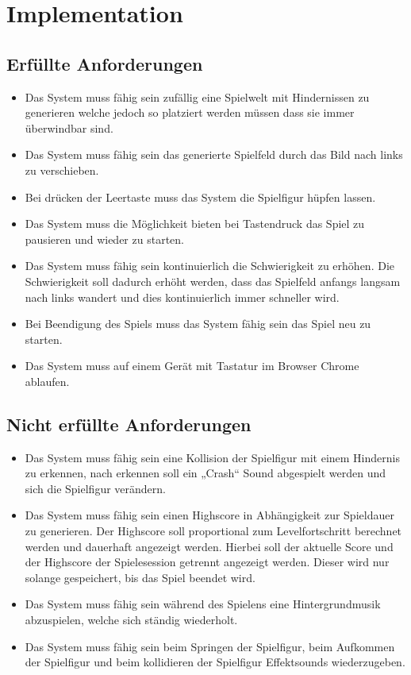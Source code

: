 \section{Implementation}
\subsection{Erfüllte Anforderungen}
\begin{itemize}
	\item Das System muss fähig sein zufällig eine Spielwelt mit Hindernissen zu generieren welche jedoch so platziert werden müssen dass sie immer überwindbar sind.
	\item Das System muss fähig sein das generierte Spielfeld durch das Bild nach links zu verschieben.
	\item Bei drücken der Leertaste muss das System die Spielfigur hüpfen lassen.
	\item Das System muss die Möglichkeit bieten bei Tastendruck das Spiel zu pausieren und wieder zu starten.
	\item Das System muss fähig sein kontinuierlich die Schwierigkeit zu erhöhen. Die Schwierigkeit soll dadurch erhöht werden, dass das Spielfeld anfangs langsam nach links wandert und dies kontinuierlich immer schneller wird.
	\item Bei Beendigung des Spiels muss das System fähig sein das Spiel neu zu starten. 
	\item Das System muss auf einem Gerät mit Tastatur im Browser Chrome ablaufen.
\end{itemize}

\subsection{Nicht erfüllte Anforderungen}
\begin{itemize}
	\item Das System muss fähig sein eine Kollision der Spielfigur mit einem Hindernis zu erkennen, nach erkennen soll ein „Crash“ Sound abgespielt werden und sich die Spielfigur verändern.
	\item Das System muss fähig sein einen Highscore in Abhängigkeit zur Spieldauer zu generieren. Der Highscore soll proportional zum Levelfortschritt berechnet werden und dauerhaft angezeigt werden. Hierbei soll der aktuelle Score und der Highscore der Spielesession getrennt angezeigt werden. Dieser wird nur solange gespeichert, bis das Spiel beendet wird.
	\item Das System muss fähig sein während des Spielens eine Hintergrundmusik abzuspielen, welche sich ständig wiederholt.
	\item Das System muss fähig sein beim Springen der Spielfigur, beim Aufkommen der Spielfigur und beim kollidieren der Spielfigur Effektsounds   wiederzugeben.
\end{itemize}
\newpage

